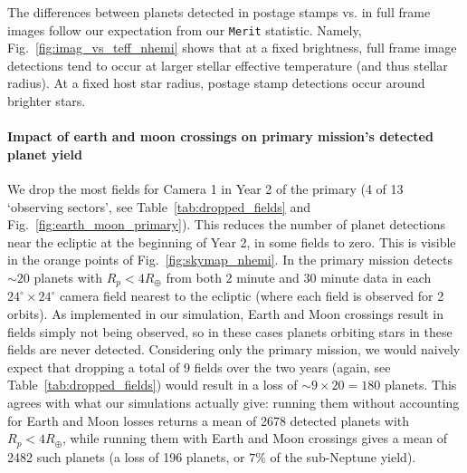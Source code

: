 The differences between planets detected in postage stamps vs. in full frame images follow our expectation from our \texttt{Merit} statistic. 
Namely, Fig.~\ref{fig:imag_vs_teff_nhemi} shows that at a fixed brightness, full frame image detections tend to occur at larger stellar effective temperature (and thus stellar radius).
At a fixed host star radius, postage stamp detections occur around brighter stars.

\paragraph{Impact of earth and moon crossings on primary mission's detected planet yield}
We drop the most fields for Camera 1 in Year 2 of the primary (4 of 13 `observing sectors', see Table~\ref{tab:dropped_fields} and Fig.~\ref{fig:earth_moon_primary}).
This reduces the number of planet detections near the ecliptic at the beginning of Year 2, in some fields to zero.
This is visible in the orange points of Fig.~\ref{fig:skymap_nhemi}.
In the primary mission \tess detects $\sim20$ planets with $R_p<4R_\oplus$ from both 2 minute and 30 minute data in each $24^\circ\times24^\circ$ camera field nearest to the ecliptic (where each field is observed for 2 \tess orbits).
As implemented in our simulation, Earth and Moon crossings result in fields simply not being observed, so in these cases planets orbiting stars in these fields are never detected.
Considering only the primary mission, we would naively expect that dropping a total of 9 fields over the two years (again, see Table~\ref{tab:dropped_fields}) would result in a loss of $\sim9\times20=180$ planets.
This agrees with what our simulations actually give: running them without accounting for Earth and Moon losses returns a mean of 2678 detected planets with $R_p<4R_\oplus$, while running them with Earth and Moon crossings gives a mean of 2482 such planets (a loss of 196 planets, or $7\%$ of the sub-Neptune yield).
